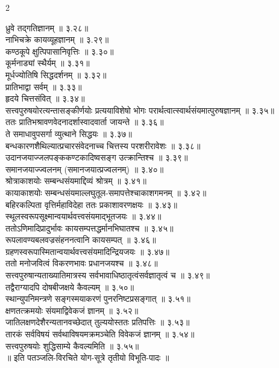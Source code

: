 \documentclass[9pt,a4paper,landscape]{article}
\begin{document}
\begin{multicols}{2}
\begin{flushleft}
ध्रुवे तद्गतिज्ञानम् ॥ ३.२८॥\\
नाभिचक्रे कायव्यूहज्ञानम् ॥ ३.२९॥\\
कण्ठकूपे क्षुत्पिपासानिवृत्तिः ॥ ३.३०॥\\
कूर्मनाड्यां स्थैर्यम् ॥ ३.३१॥\\
मूर्धज्योतिषि सिद्धदर्शनम् ॥ ३.३२॥\\
प्रातिभाद्वा सर्वम् ॥ ३.३३॥\\
हृदये चित्तसंवित् ॥ ३.३४॥\\
सत्त्वपुरुषयोरत्यन्तासङ्कीर्णयोः प्रत्ययाविशेषो भोगः परार्थत्वात्स्वार्थसंयमात्पुरुषज्ञानम् ॥ ३.३५॥\\
ततः प्रातिभश्रावणवेदनादर्शास्वादवार्ता जायन्ते ॥ ३.३६॥\\
ते समाधावुपसर्गा व्युत्थाने सिद्धयः ॥ ३.३७॥\\
बन्धकारणशैथिल्यात्प्रचारसंवेदनाच्च चित्तस्य परशरीरावेशः ॥ ३.३८॥\\
उदानजयाज्जलपङ्ककण्टकादिष्वसङ्ग उत्क्रान्तिश्च ॥ ३.३९॥\\
समानजयाज्ज्वलनम्  (समानजयात्प्रज्वलनम्) ॥ ३.४०॥\\
श्रोत्राकाशयोः सम्बन्धसंयमाद्दिव्यं श्रोत्रम् ॥ ३.४१॥\\
कायाकाशयोः सम्बन्धसंयमाल्लघुतूल-समापत्तेश्चाकाशगमनम् ॥ ३.४२॥\\
बहिरकल्पिता वृत्तिर्महाविदेहा ततः प्रकाशावरणक्षयः ॥ ३.४३॥\\
स्थूलस्वरूपसूक्ष्मान्वयार्थवत्त्वसंयमाद्भूतजयः ॥ ३.४४॥\\
ततोऽणिमादिप्रादुर्भावः कायसम्पत्तद्धर्मानभिघातश्च ॥ ३.४५॥\\
रूपलावण्यबलवज्रसंहननत्वानि कायसम्पत् ॥ ३.४६॥\\
ग्रहणस्वरूपास्मितान्वयार्थवत्त्वसंयमादिन्द्रियजयः ॥ ३.४७॥\\
ततो मनोजवित्वं विकरणभावः प्रधानजयश्च ॥ ३.४८॥\\
सत्त्वपुरुषान्यताख्यातिमात्रस्य सर्वभावाधिष्ठातृत्वंसर्वज्ञातृत्वं च ॥ ३.४९॥\\
तद्वैराग्यादपि दोषबीजक्षये कैवल्यम् ॥ ३.५०॥\\
स्थान्युपनिमन्त्रणे सङ्गस्मयाकरणं पुनरनिष्टप्रसङ्गात् ॥ ३.५१॥\\
क्षणतत्क्रमयोः संयमाद्विवेकजं ज्ञानम् ॥ ३.५२॥\\
जातिलक्षणदेशैरन्यतानवच्छेदात् तुल्ययोस्ततः प्रतिपत्तिः ॥ ३.५३॥\\
तारकं सर्वविषयं सर्वथाविषयमक्रमञ्चेति विवेकजं ज्ञानम् ॥ ३.५४॥\\
सत्त्वपुरुषयोः शुद्धिसाम्ये कैवल्यमिति ॥ ३.५५॥\\
॥ इति पतञ्जलि-विरचिते योग-सूत्रे तृतीयो विभूति-पादः ॥\\
\end{flushleft}


\end{multicols}
\end{document}
